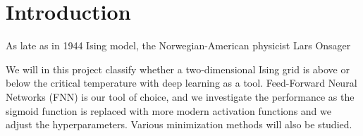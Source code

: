 \section{Introduction} \label{sec:introduction}
As late as in 1944 Ising model, the Norwegian-American physicist Lars Onsager

We will in this project classify whether a two-dimensional Ising grid is above or below the critical temperature with deep learning as a tool. Feed-Forward Neural Networks (FNN) is our tool of choice, and we investigate the performance as the sigmoid function is replaced with more modern activation functions and we adjust the hyperparameters. Various minimization methods will also be studied. 



